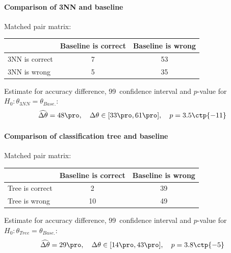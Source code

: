 \documentclass[11pt,fleqn]{article}
\begin{document}
\paragraph{Comparison of 3NN and baseline}
Matched pair matrix:

\begin{table}[H]
	\centering
	\begin{tabular}{l|c c}
		&Baseline is correct& Baseline is wrong \\
		\hline
		3NN is correct &7& 53\\
		3NN is wrong& 5& 35
	\end{tabular}
\end{table}\noindent 
Estimate for accuracy difference, 99\pro\ confidence interval and \(p\)-value for \(H_0: \theta_{3NN}=\theta_{Base.}\):
\[
\widehat{\Delta \theta} = 48\pro,\quad  \Delta \theta\in[33\pro , 61\pro], \quad p = 3.5\ctp{-11}
\]
\paragraph{Comparison of classification tree and baseline}
Matched pair matrix:

\begin{table}[H]
	\centering
	\begin{tabular}{l|c c}
		&Baseline is correct& Baseline is wrong \\
		\hline
		Tree is correct &2& 39\\
		Tree is wrong& 10& 49
	\end{tabular}
\end{table}\noindent 
Estimate for accuracy difference, 99\pro\ confidence interval and \(p\)-value for \(H_0: \theta_{Tree}=\theta_{Base.}\):
\[
\widehat{\Delta \theta} = 29\pro,\quad  \Delta \theta\in[14\pro , 43\pro], \quad p = 3.8\ctp{-5}
\]
\end{document}
